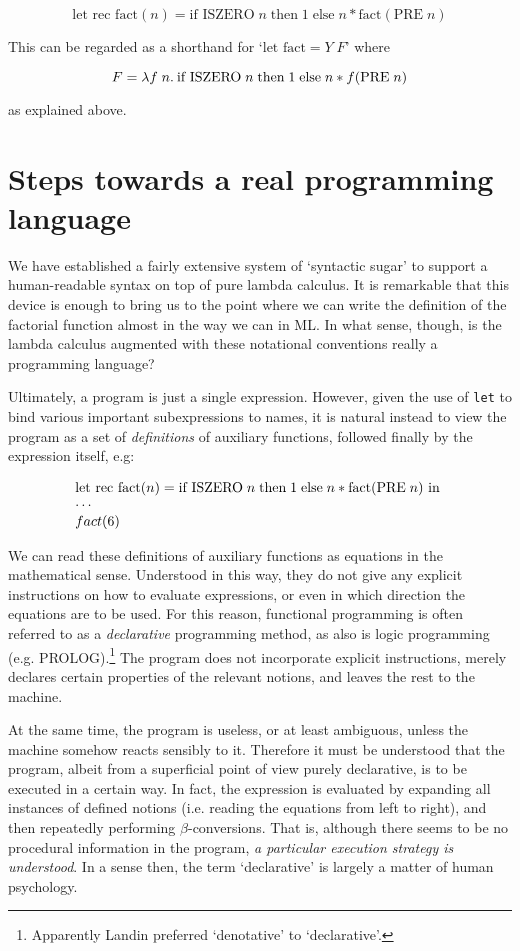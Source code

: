 $$ \mbox{let rec fact}(n) = \mbox{if ISZERO}\; n\; \mbox{then}\; 1\;
                            \mbox{else}\; n * \mbox{fact}(\mbox{PRE}\; n) $$

\noindent This can be regarded as a shorthand for `$\mbox{let fact} = Y\; F$'
where

$$ F = \lambda f\; n.\: \mbox{if ISZERO}\; n\; \mbox{then}\; 1\; \mbox{else}\; n *
f(\mbox{PRE}\; n)$$

\noindent as explained above.

\section{Steps towards a real programming language}

We have established a fairly extensive system of `syntactic sugar' to support a
human-readable syntax on top of pure lambda calculus. It is remarkable that
this device is enough to bring us to the point where we can write the
definition of the factorial function almost in the way we can in ML. In what
sense, though, is the lambda calculus augmented with these notational
conventions really a programming language?

Ultimately, a program is just a single expression. However, given the use of
{\tt let} to bind various important subexpressions to names, it is natural
instead to view the program as a set of {\em definitions} of auxiliary
functions, followed finally by the expression itself, e.g:

$$ \begin{array}[t]{l} \mbox{let rec fact}(n) = \mbox{if ISZERO}\; n\; \mbox{then}\; 1\;
                            \mbox{else}\; n * \mbox{fact}(\mbox{PRE}\; n)
                        \mbox{ in }\\
       \cdots\\
       fact(6)
   \end{array}
$$

We can read these definitions of auxiliary functions as equations in the
mathematical sense. Understood in this way, they do not give any explicit
instructions on how to evaluate expressions, or even in which direction the
equations are to be used. For this reason, functional programming is often
referred to as a {\em declarative} programming method, as also is logic
programming (e.g. PROLOG).\footnote{Apparently Landin preferred `denotative' to
`declarative'.} The program does not incorporate explicit instructions, merely
declares certain properties of the relevant notions, and leaves the rest to the
machine.

At the same time, the program is useless, or at least ambiguous, unless the
machine somehow reacts sensibly to it. Therefore it must be understood that the
program, albeit from a superficial point of view purely declarative, is to be
executed in a certain way. In fact, the expression is evaluated by expanding
all instances of defined notions (i.e. reading the equations from left to
right), and then repeatedly performing $\beta$-conversions. That is, although
there seems to be no procedural information in the program, {\em a particular
execution strategy is understood}. In a sense then, the term `declarative' is
largely a matter of human psychology.

